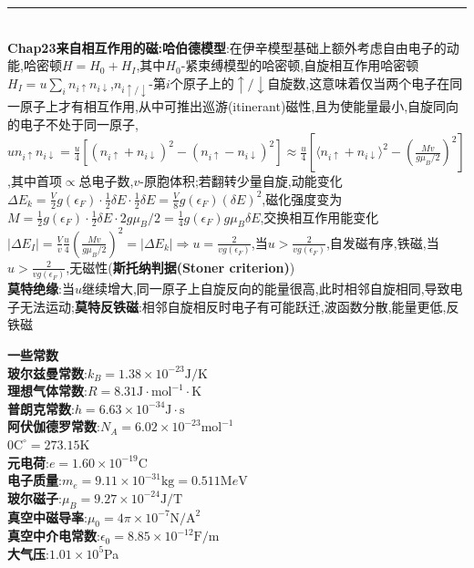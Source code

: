 \documentclass[UTF8,10pt,a4paper]{article}
\providecommand{\abs}[1]{\lvert#1\rvert}
\begin{document}
\begin{multicols}{2}
\rule{\columnwidth}{.2pt}\\
\textbf{Chap23来自相互作用的磁:哈伯德模型}:在伊辛模型基础上额外考虑自由电子的动能,哈密顿$H=H_0+H_I$,其中$H_0$-紧束缚模型的哈密顿,自旋相互作用哈密顿$H_I=u\sum_in_{i\uparrow}n_{i\downarrow}$,$n_{i\uparrow/\downarrow}$-第$i$个原子上的$\uparrow/\downarrow$自旋数,这意味着仅当两个电子在同一原子上才有相互作用,从中可推出巡游(itinerant)磁性,且为使能量最小,自旋同向的电子不处于同一原子,$un_{i\uparrow}n_{i\downarrow}=\frac{u}{4}[(n_{i\uparrow}+n_{i\downarrow})^2-(n_{i\uparrow}-n_{i\downarrow})^2]\approx\frac{u}{4}[\langle n_{i\uparrow}+n_{i\downarrow}\rangle^2-(\frac{Mv}{g\mu_B/2})^2]$,其中首项$\propto$总电子数,$v$-原胞体积;若翻转少量自旋,动能变化$\Delta E_k=\frac{V}{2}g(\epsilon_F)\cdot\frac{1}{2}\delta E\cdot\frac{1}{2}\delta E=\frac{V}{8}g(\epsilon_F)(\delta E)^2$,磁化强度变为$M=\frac{1}{2}g(\epsilon_F)\cdot\frac{1}{2}\delta E\cdot 2g\mu_B/2=\frac{1}{4}g(\epsilon_F)g\mu_B\delta E$,交换相互作用能变化$\abs{\Delta E_I}=\frac{V}{v}\frac{u}{4}(\frac{Mv}{g\mu_B/2})^2=\abs{\Delta E_k}\Rightarrow u=\frac{2}{vg(\epsilon_F)}$,当$u>\frac{2}{vg(\epsilon_F)}$,自发磁有序,铁磁,当$u>\frac{2}{vg(\epsilon_F)}$,无磁性(\textbf{斯托纳判据(Stoner criterion)})\\
\textbf{莫特绝缘}:当$u$继续增大,同一原子上自旋反向的能量很高,此时相邻自旋相同,导致电子无法运动;\textbf{莫特反铁磁}:相邻自旋相反时电子有可能跃迁,波函数分散,能量更低,反铁磁
\end{multicols}
\begin{multicols}{4}
\noindent\textbf{一些常数}\\
\textbf{玻尔兹曼常数}:$k_B=1.38\times 10^{-23}\text{J}/\text{K}$\\
\textbf{理想气体常数}:$R=8.31\text{J}\cdot\text{mol}^{-1}\cdot\text{K}$\\
\textbf{普朗克常数}:$h=6.63\times 10^{-34}\text{J}\cdot\text{s}$\\
\textbf{阿伏伽德罗常数}:$N_A=6.02\times 10^{-23}\text{mol}^{-1}$\\
$0\text{C}^{\circ}=273.15$K\\
\textbf{元电荷}:$e=1.60\times 10^{-19}$C\\
\textbf{电子质量}:$m_e=9.11\times 10^{-31}\text{kg}=0.511$M$e$V\\
\textbf{玻尔磁子}:$\mu_B=9.27\times 10^{-24}\text{J}/\text{T}$\\
\textbf{真空中磁导率}:$\mu_0=4\pi\times 10^{-7}\text{N}/\text{A}^2$\\
\textbf{真空中介电常数}:$\epsilon_0=8.85\times 10^{-12}\text{F}/\text{m}$\\
\textbf{大气压}:$1.01\times 10^5$Pa
\end{multicols}
\end{document}
